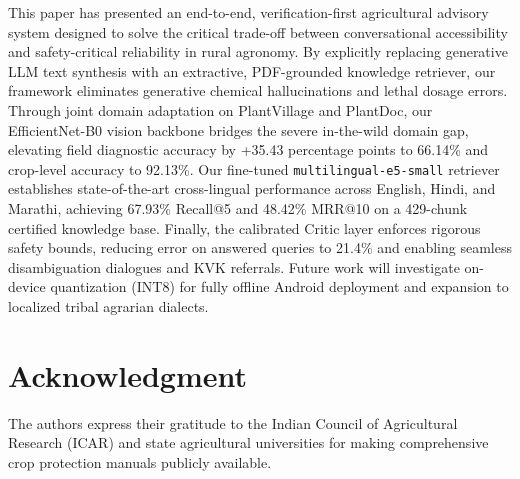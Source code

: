 \documentclass[conference]{IEEEtran}
\begin{document}
This paper has presented an end-to-end, verification-first agricultural advisory system designed to solve the critical trade-off between conversational accessibility and safety-critical reliability in rural agronomy. By explicitly replacing generative LLM text synthesis with an extractive, PDF-grounded knowledge retriever, our framework eliminates generative chemical hallucinations and lethal dosage errors. Through joint domain adaptation on PlantVillage and PlantDoc, our EfficientNet-B0 vision backbone bridges the severe in-the-wild domain gap, elevating field diagnostic accuracy by +35.43 percentage points to 66.14\% and crop-level accuracy to 92.13\%. Our fine-tuned \texttt{multilingual-e5-small} retriever establishes state-of-the-art cross-lingual performance across English, Hindi, and Marathi, achieving 67.93\% Recall@5 and 48.42\% MRR@10 on a 429-chunk certified knowledge base. Finally, the calibrated Critic layer enforces rigorous safety bounds, reducing error on answered queries to 21.4\% and enabling seamless disambiguation dialogues and KVK referrals. Future work will investigate on-device quantization (INT8) for fully offline Android deployment and expansion to localized tribal agrarian dialects.

\section*{Acknowledgment}
The authors express their gratitude to the Indian Council of Agricultural Research (ICAR) and state agricultural universities for making comprehensive crop protection manuals publicly available.
\end{document}
